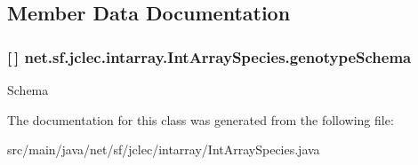 \subsection{Member Data Documentation}
\hypertarget{classnet_1_1sf_1_1jclec_1_1intarray_1_1_int_array_species_a715c2117e4b1c70ab004accbf15848b7}{
\subsubsection[{genotype\-Schema}]{ \mbox{[}$\,$\mbox{]} net.\-sf.\-jclec.\-intarray.\-Int\-Array\-Species.\-genotype\-Schema\hspace{0.3cm}{\ttfamily [protected]}}}\label{classnet_1_1sf_1_1jclec_1_1intarray_1_1_int_array_species_a715c2117e4b1c70ab004accbf15848b7}
Schema 

The documentation for this class was generated from the following file\-:\begin{DoxyCompactItemize}
\item 
src/main/java/net/sf/jclec/intarray/Int\-Array\-Species.\-java\end{DoxyCompactItemize}
